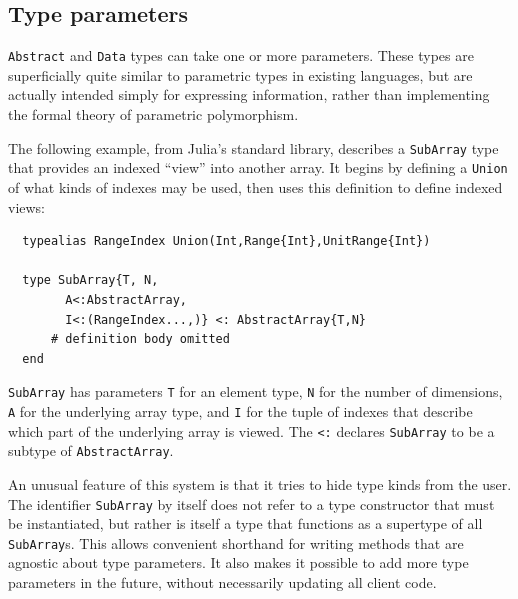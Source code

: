\documentclass[pldi]{sigplanconf-pldi15}
\begin{document}



\subsection{Type parameters}
\label{sec:typeparameters}

\verb|Abstract| and \verb|Data| types can take one or more parameters. These
types are superficially quite similar to parametric types in existing
languages, but are actually intended simply for expressing information, rather
than implementing the formal theory of parametric polymorphism.

The following example, from Julia's standard library, describes a \verb|SubArray|
type that provides an indexed ``view'' into another array. It begins by
defining a \verb|Union| of what kinds of indexes may be used, then uses this
definition to define indexed views:

\begin{lstlisting}
  typealias RangeIndex Union(Int,Range{Int},UnitRange{Int})

  type SubArray{T, N,
		A<:AbstractArray,
		I<:(RangeIndex...,)} <: AbstractArray{T,N}
      # definition body omitted
  end
\end{lstlisting}
%
\verb|SubArray| has parameters \verb|T| for an element type, \verb|N| for the
number of dimensions, \verb|A| for the underlying array type, and \verb|I|
for the tuple of indexes that describe which part of the underlying array
is viewed. The \verb|<:| declares \verb|SubArray| to be a subtype of
\verb|AbstractArray|.

An unusual feature of this system is that it tries to hide type kinds from
the user. The identifier \verb|SubArray| by itself does not refer to a
type constructor that must be instantiated, but rather is itself a type
that functions as a supertype of all \verb|SubArray|s. This allows
convenient shorthand for writing methods that are agnostic about type parameters.
It also makes it possible to add more type parameters in the future, without
necessarily updating all client code.
\end{document}
